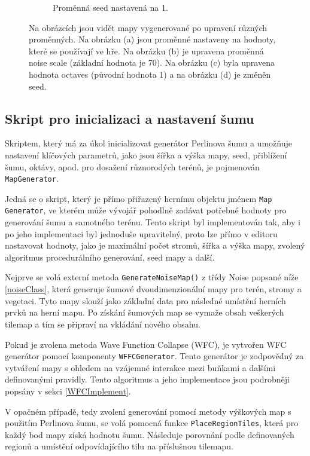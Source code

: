 \begin{figure}[H]
\begin{subfigure}{0.475\textwidth}
		\caption{Proměnná seed nastavená na 1.}
	\end{subfigure}
	\caption{Na obrázcích jsou vidět mapy vygenerované po upravení různých proměnných. Na obrázku (a) jsou proměnné nastaveny na hodnoty, které se používají ve hře. Na obrázku (b) je upravena proměnná noise scale (základní hodnota je 70). Na obrázku (c) byla upravena hodnota octaves (původní hodnota 1) a na obrázku (d) je změněn seed.}
	\label{NoiseScale}
\end{figure}

\subsection{Skript pro inicializaci a nastavení šumu}
Skriptem, který má za úkol inicializovat generátor Perlinova šumu a umožňuje nastavení klíčových parametrů, jako jsou šířka a výška mapy, seed, přiblížení šumu, oktávy, apod. pro dosažení různorodých terénů, je pojmenován \texttt{MapGenerator}. 

Jedná se o skript, který je přímo přiřazený hernímu objektu jménem \texttt{Map Generator}, ve kterém může vývojář pohodlně zadávat potřebné hodnoty pro generování šumu a samotného terénu. Tento skript byl implementován tak, aby i po jeho implementaci byl jednoduše upravitelný, proto lze přímo v editoru nastavovat hodnoty, jako je maximální počet stromů, šířka a výška mapy, zvolený algoritmus procedurálního generování, seed mapy a další.

Nejprve se volá externí metoda \texttt{GenerateNoiseMap()} z třídy Noise popsané níže \ref{noiseClass}, která generuje šumové dvoudimenzionální mapy pro terén, stromy a vegetaci. Tyto mapy slouží jako základní data pro následné umístění herních prvků na herní mapu. Po získání šumových map se vymaže obsah veškerých tilemap a tím se připraví na vkládání nového obsahu.

Pokud je zvolena metoda Wave Function Collapse (WFC), je vytvořen WFC generátor pomocí komponenty \texttt{WFFCGenerator}. Tento generátor je zodpovědný za vytváření mapy s ohledem na vzájemné interakce mezi buňkami a dalšími definovanými pravidly. Tento algoritmus a jeho implementace jsou podrobněji popsány v sekci \ref{WFCImplement}.

V opačném případě, tedy zvolení generování pomocí metody výškových map s použitím Perlinova šumu, se volá pomocná funkce \texttt{PlaceRegionTiles}, která pro každý bod mapy získá hodnotu šumu. Následuje porovnání podle definovaných regionů a umístění odpovídajícího tilu na příslušnou tilemapu.

